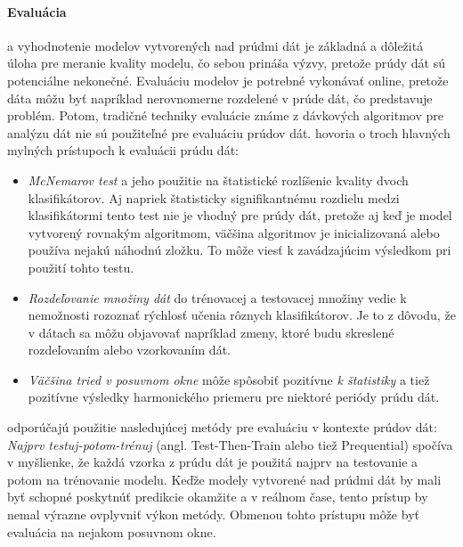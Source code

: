 \paragraph{Evaluácia} a vyhodnotenie modelov vytvorených nad prúdmi dát je základná a dôležitá úloha pre meranie kvality modelu, čo sebou prináša výzvy, pretože prúdy dát sú potenciálne nekonečné. Evaluáciu modelov je potrebné vykonávať online, pretože dáta môžu byť napríklad nerovnomerne rozdelené v prúde dát, čo predstavuje problém. Potom, tradičné techniky evaluácie známe z dávkových algoritmov pre analýzu dát nie sú použiteľné pre evaluáciu prúdov dát. \citet{bifet2015efficient} hovoria o troch hlavných mylných prístupoch k evaluácii prúdu dát:
\begin{itemize}
	\item \textit{McNemarov test} a jeho použitie na štatistické rozlíšenie kvality dvoch klasifikátorov. Aj napriek štatisticky signifikantnému rozdielu medzi klasifikátormi tento test nie je vhodný pre prúdy dát, pretože aj keď je model vytvorený rovnakým algoritmom, väčšina algoritmov je inicializovaná alebo používa nejakú náhodnú zložku. To môže viesť k zavádzajúcim výsledkom pri použití tohto testu.
	\item \textit{Rozdeľovanie množiny dát} do trénovacej a testovacej množiny vedie k nemožnosti rozoznať rýchlosť učenia rôznych klasifikátorov. Je to z dôvodu, že v dátach sa môžu objavovať napríklad zmeny, ktoré budu skreslené rozdeľovaním alebo vzorkovaním dát.
	\item \textit{Väčšina tried v posuvnom okne} môže spôsobiť pozitívne \textit{k štatistiky} a tiež pozitívne výsledky harmonického priemeru pre niektoré periódy prúdu dát.
\end{itemize}

\citet{bifet2015efficient} odporúčajú použitie nasledujúcej metódy pre evaluáciu v kontexte prúdov dát: \textit{Najprv testuj-potom-trénuj} (angl. Test-Then-Train alebo tiež Prequential) spočíva v myšlienke, že každá vzorka z prúdu dát je použitá najprv na testovanie a potom na trénovanie modelu. Keďže modely vytvorené nad prúdmi dát by mali byť schopné poskytnúť predikcie okamžite a v reálnom čase, tento prístup by nemal výrazne ovplyvniť výkon metódy. Obmenou tohto prístupu môže byť evaluácia na nejakom posuvnom okne.


